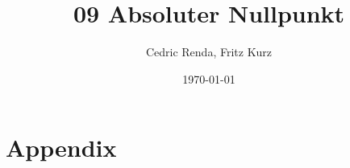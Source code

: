 \documentclass[12pt,a4paper]{article}
\title{09 Absoluter Nullpunkt}
\author{Cedric Renda, Fritz Kurz}
\date{\today }
\begin{document}
\maketitle

\tableofcontents
\newpage






%
\newpage
%

\section{Appendix}


\end{document}
